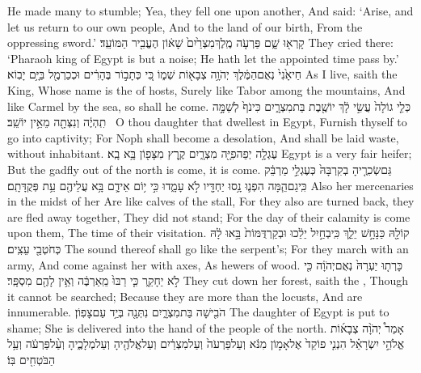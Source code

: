 {He made many to stumble; Yea, they fell one upon another, And said: ‘Arise, and let us return to our own people, And to the land of our birth, From the oppressing sword.’}
{קָרְא֖וּ שָׁ֑ם פַּרְעֹ֤ה מֶֽלֶךְ\maqqaf מִצְרַ֙יִם֙ שָׁא֔וֹן הֶעֱבִ֖יר הַמּוֹעֵֽד׃}
{They cried there: ‘Pharaoh king of Egypt is but a noise; He hath let the appointed time pass by.’}
{חַי\maqqaf אָ֙נִי֙ נְאֻם\maqqaf הַמֶּ֔לֶךְ יְהֹוָ֥ה צְבָא֖וֹת שְׁמ֑וֹ כִּ֚י כְּתָב֣וֹר בֶּהָרִ֔ים וּכְכַרְמֶ֖ל בַּיָּ֥ם יָבֽוֹא׃}
{As I live, saith the King, Whose name is the \lord\space of hosts, Surely like Tabor among the mountains, And like Carmel by the sea, so shall he come.}
{כְּלֵ֤י גוֹלָה֙ עֲשִׂ֣י לָ֔ךְ יוֹשֶׁ֖בֶת בַּת\maqqaf מִצְרָ֑יִם כִּי\maqqaf נֹף֙ לְשַׁמָּ֣ה תִֽהְיֶ֔ה וְנִצְּתָ֖ה מֵאֵ֥ין יוֹשֵֽׁב׃ \setuma }
{O thou daughter that dwellest in Egypt, Furnish thyself to go into captivity; For Noph shall become a desolation, And shall be laid waste, without inhabitant.}
{עֶגְלָ֥ה יְפֵה\maqqaf פִיָּ֖ה מִצְרָ֑יִם קֶ֥רֶץ מִצָּפ֖וֹן בָּ֥א בָֽא׃}
{Egypt is a very fair heifer; But the gadfly out of the north is come, it is come.}
{גַּם\maqqaf שְׂכִרֶ֤יהָ בְקִרְבָּהּ֙ כְּעֶגְלֵ֣י מַרְבֵּ֔ק כִּֽי\maqqaf גַם\maqqaf הֵ֧מָּה הִפְנ֛וּ נָ֥סוּ יַחְדָּ֖יו לֹ֣א עָמָ֑דוּ כִּ֣י י֥וֹם אֵידָ֛ם בָּ֥א עֲלֵיהֶ֖ם עֵ֥ת פְּקֻדָּתָֽם׃}
{Also her mercenaries in the midst of her Are like calves of the stall, For they also are turned back, they are fled away together, They did not stand; For the day of their calamity is come upon them, The time of their visitation.}
{קוֹלָ֖הּ כַּנָּחָ֣שׁ יֵלֵ֑ךְ כִּֽי\maqqaf בְחַ֣יִל יֵלֵ֔כוּ וּבְקַרְדֻּמּוֹת֙ בָּ֣אוּ לָ֔הּ כְּחֹטְבֵ֖י עֵצִֽים׃}
{The sound thereof shall go like the serpent’s; For they march with an army, And come against her with axes, As hewers of wood.}
{כָּרְת֤וּ יַעְרָהּ֙ נְאֻם\maqqaf יְהֹוָ֔ה כִּ֖י לֹ֣א יֵחָקֵ֑ר כִּ֤י רַבּוּ֙ מֵֽאַרְבֶּ֔ה וְאֵ֥ין לָהֶ֖ם מִסְפָּֽר׃}
{They cut down her forest, saith the \lord, Though it cannot be searched; Because they are more than the locusts, And are innumerable.}
{הֹבִ֖ישָׁה בַּת\maqqaf מִצְרָ֑יִם נִתְּנָ֖ה בְּיַ֥ד עַם\maqqaf צָפֽוֹן׃}
{The daughter of Egypt is put to shame; She is delivered into the hand of the people of the north.}
{אָמַר֩ יְהֹוָ֨ה צְבָא֜וֹת אֱלֹהֵ֣י יִשְׂרָאֵ֗ל הִנְנִ֤י פוֹקֵד֙ אֶל\maqqaf אָמ֣וֹן מִנֹּ֔א וְעַל\maqqaf פַּרְעֹה֙ וְעַל\maqqaf מִצְרַ֔יִם וְעַל\maqqaf אֱלֹהֶ֖יהָ וְעַל\maqqaf מְלָכֶ֑יהָ וְעַ֨ל\maqqaf פַּרְעֹ֔ה וְעַ֥ל הַבֹּטְחִ֖ים בּֽוֹ׃}
